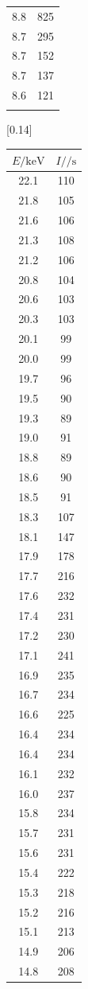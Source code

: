 \begin{table}[h! p]
{\begin{tabular}{|c c|}
    8.8 & 825 \\
    8.7 & 295 \\
    8.7 & 152 \\
    8.7 & 137 \\
    8.6 & 121 \\
    & \\
    \bottomrule
  \end{tabular}
  }\qquad \hfill
  [0.14\textwidth]{
  \begin{tabular}{|c c}
    \toprule
    $E / \si{\kilo\electronvolt}$ & $I / \si{\per\second}$ \\
    \midrule
    22.1 & 110 \\
    21.8 & 105 \\
    21.6 & 106 \\
    21.3 & 108 \\
    21.2 & 106 \\
    20.8 & 104 \\
    20.6 & 103 \\
    20.3 & 103 \\
    20.1 & 99 \\
    20.0 & 99 \\
    19.7 & 96 \\
    19.5 & 90 \\
    19.3 & 89 \\
    19.0 & 91 \\
    18.8 & 89 \\
    18.6 & 90 \\
    18.5 & 91 \\
    18.3 & 107 \\
    18.1 & 147 \\
    17.9 & 178 \\
    17.7 & 216 \\
    17.6 & 232 \\
    17.4 & 231 \\
    17.2 & 230 \\
    17.1 & 241 \\
    16.9 & 235 \\
    16.7 & 234 \\
    16.6 & 225 \\
    16.4 & 234 \\
    16.4 & 234 \\
    16.1 & 232 \\
    16.0 & 237 \\
    15.8 & 234 \\
    15.7 & 231 \\
    15.6 & 231 \\
    15.4 & 222 \\
    15.3 & 218 \\
    15.2 & 216 \\
    15.1 & 213 \\
    14.9 & 206 \\
    14.8 & 208 \\
    \bottomrule
  \end{tabular}
  }

\end{table}

